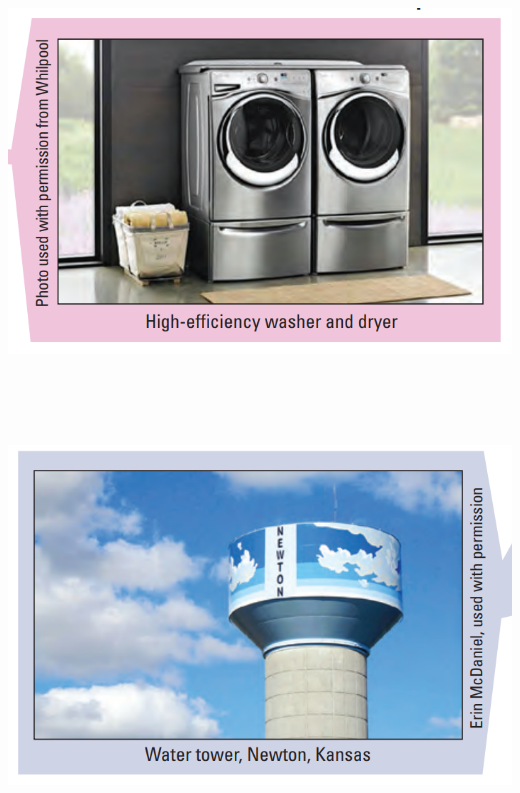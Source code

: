 \documentclass[]{article}
\begin{document}
\includegraphics[width=\textwidth,height=4.16667in]{figures/m10_domestic.png}

\hypertarget{section-17}{%
\subsection{}\label{section-17}}

\includegraphics[width=\textwidth,height=4.16667in]{figures/m10_public.png}

\hypertarget{section-18}{%
\subsection{}\label{section-18}}
\end{document}
